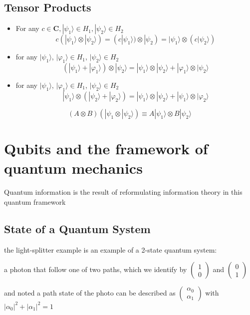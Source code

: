 \documentclass[10pt]{article}
\theoremstyle{break}
\begin{document}
\subsection{Tensor Products}
\begin{itemize}
    \item For any $c\in\mathbf{C},|\psi_1\rangle\in H_1, |\psi_2\rangle\in H_2$
    $$c(|\psi_1\rangle\otimes|\psi_2\rangle)=
    (c|\psi_1\rangle)\otimes|\psi_2)=
    |\psi_1\rangle\otimes(c|\psi_2\rangle)$$
    \item for any $|\psi_1\rangle$, $|\varphi_1\rangle\in H_1$, $|\psi_2\rangle\in H_2$
    $$(|\psi_1\rangle+|\varphi_1\rangle)\otimes|\psi_2\rangle=
    |\psi_1\rangle\otimes |\psi_2\rangle+|\varphi_1\rangle\otimes|\psi_2\rangle$$
    \item for any $|\psi_1\rangle$, $|\varphi_1\rangle\in H_1$, $|\psi_2\rangle\in H_2$
    $$|\psi_1\rangle\otimes(|\psi_2\rangle+|\varphi_2\rangle)=
    |\psi_1\rangle\otimes |\psi_2\rangle+|\psi_1\rangle\otimes|\varphi_2\rangle$$
\end{itemize}

$$(A\otimes B)(|\psi_1\otimes|\psi_2\rangle)\equiv A|\psi_1\rangle \otimes B |\psi_2\rangle$$


\section{Qubits and the framework of quantum mechanics}
Quantum information is the result of reformulating information theory 
in this quantum framework

\subsection{State of a Quantum System}
the light-splitter example is an example of a 2-state quantum system:

a photon that follow one of two paths, which we identify by 
$\begin{pmatrix}
   1\\
   0 
\end{pmatrix}$
and
$\begin{pmatrix}
   0\\
   1 
\end{pmatrix}$

and noted a path state of the photo can be described as 
$\begin{pmatrix}
   \alpha_0\\
   \alpha_1
\end{pmatrix}$
with $|\alpha_0|^2+|\alpha_1|^2=1$
\end{document}
